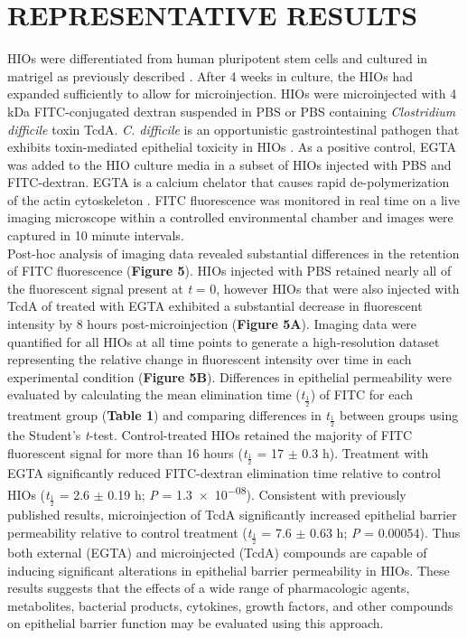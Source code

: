 \documentclass[11pt]{article}
\begin{document}
\section*{REPRESENTATIVE RESULTS}
HIOs were differentiated from human pluripotent stem cells and cultured in matrigel as previously described \supercite{Spence:2011,McCracken:2011}. After 4 weeks in culture, the HIOs had expanded sufficiently to allow for microinjection. HIOs were microinjected with 4 kDa FITC-conjugated dextran suspended in PBS or PBS containing \emph{Clostridium difficile} toxin TcdA. \emph{C. difficile} is an opportunistic gastrointestinal pathogen that exhibits toxin-mediated epithelial toxicity in HIOs \supercite{Leslie:2015}. As a positive control, EGTA was added to the HIO culture media in a subset of HIOs injected with PBS and FITC-dextran. EGTA is a calcium chelator that causes rapid de-polymerization of the actin cytoskeleton \supercite{Selden:1983}. FITC fluorescence was monitored in real time on a live imaging microscope within a controlled environmental chamber and images were captured in 10 minute intervals.\\
Post-hoc analysis of imaging data revealed substantial differences in the retention of FITC fluorescence (\textbf{Figure 5}). HIOs injected with PBS retained nearly all of the fluorescent signal present at \emph{t} = 0, however HIOs that were also injected with TcdA of treated with EGTA exhibited a substantial decrease in fluorescent intensity by 8 hours post-microinjection (\textbf{Figure 5A}). Imaging data were quantified for all HIOs at all time points to generate a high-resolution dataset representing the relative change in fluorescent intensity over time in each experimental condition (\textbf{Figure 5B}). Differences in epithelial permeability were evaluated by calculating the mean elimination time (\textit{t}\(_\frac{1}{2}\)) of FITC for each treatment group (\textbf{Table 1}) and comparing differences in \textit{t}\(_\frac{1}{2}\) between groups using the Student's \emph{t}-test. Control-treated HIOs retained the majority of FITC fluorescent signal for more than 16 hours (\textit{t}\(_\frac{1}{2}\) = 17 \(\pm\) 0.3 h). Treatment with EGTA significantly reduced FITC-dextran elimination time relative to control HIOs (\textit{t}\(_\frac{1}{2}\) = 2.6 \(\pm\) 0.19 h; \emph{P} = \num{1.3e-08}). Consistent with previously published results\supercite{Leslie:2015}, microinjection of TcdA significantly increased epithelial barrier permeability relative to control treatment (\textit{t}\(_\frac{1}{2}\) = 7.6 \(\pm\) 0.63 h; \emph{P} = \num{0.00054}). Thus both external (EGTA) and microinjected (TcdA) compounds are capable of inducing significant alterations in epithelial barrier permeability in HIOs. These results suggests that the effects of a wide range of pharmacologic agents, metabolites, bacterial products, cytokines, growth factors, and other compounds on epithelial barrier function may be evaluated using this approach.\\
\end{document}
